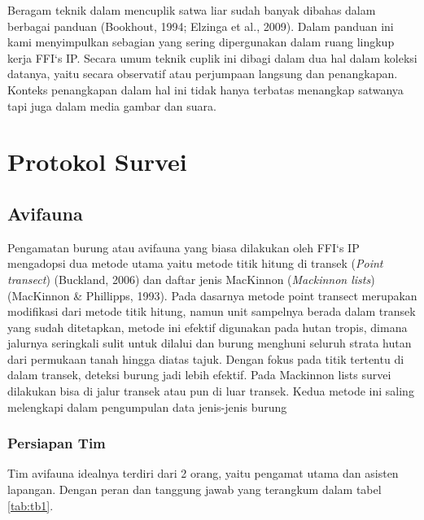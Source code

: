 \documentclass[
]{book}
\begin{document}
Beragam teknik dalam mencuplik satwa liar sudah banyak dibahas dalam berbagai panduan (Bookhout, 1994; Elzinga et al., 2009). Dalam panduan ini kami menyimpulkan sebagian yang sering dipergunakan dalam ruang lingkup kerja FFI`s IP. Secara umum teknik cuplik ini dibagi dalam dua hal dalam koleksi datanya, yaitu secara observatif atau perjumpaan langsung dan penangkapan. Konteks penangkapan dalam hal ini tidak hanya terbatas menangkap satwanya tapi juga dalam media gambar dan suara.

\hypertarget{protokol-survei}{%
\chapter*{Protokol Survei}\label{protokol-survei}}

\hypertarget{avifauna}{%
\section*{Avifauna}\label{avifauna}}

Pengamatan burung atau avifauna yang biasa dilakukan oleh FFI`s IP mengadopsi dua metode utama yaitu metode titik hitung di transek (\emph{Point transect}) (Buckland, 2006) dan daftar jenis MacKinnon (\emph{Mackinnon lists}) (MacKinnon \& Phillipps, 1993). Pada dasarnya metode point transect merupakan modifikasi dari metode titik hitung, namun unit sampelnya berada dalam transek yang sudah ditetapkan, metode ini efektif digunakan pada hutan tropis, dimana jalurnya seringkali sulit untuk dilalui dan burung menghuni seluruh strata hutan dari permukaan tanah hingga diatas tajuk. Dengan fokus pada titik tertentu di dalam transek, deteksi burung jadi lebih efektif. Pada Mackinnon lists survei dilakukan bisa di jalur transek atau pun di luar transek. Kedua metode ini saling melengkapi dalam pengumpulan data jenis-jenis burung

\hypertarget{persiapan-tim}{%
\subsection*{Persiapan Tim}\label{persiapan-tim}}

Tim avifauna idealnya terdiri dari 2 orang, yaitu pengamat utama dan asisten lapangan. Dengan peran dan tanggung jawab yang terangkum dalam tabel \ref{tab:tb1}.
\end{document}
